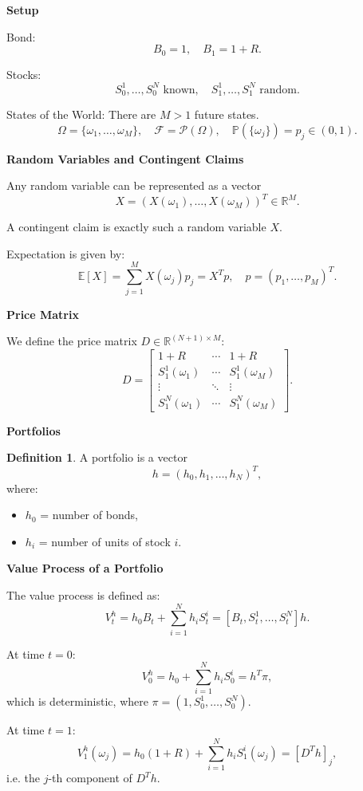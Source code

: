 \documentclass[12pt,a4paper]{article}
\theoremstyle{definition}
\newtheorem{definition}{Definition}[section]
\newcommand{\R}{\mathbb{R}}
\newcommand{\E}{\mathbb{E}}
\newcommand{\Prob}{\mathbb{P}}
\begin{document}
\textbf{Setup}

Bond:
\[
B_0 = 1, \quad B_1 = 1 + R.
\]

Stocks:
\[
S_0^1, \ldots, S_0^N \text{ known}, \quad S_1^1, \ldots, S_1^N \text{ random}.
\]

States of the World:
There are $M > 1$ future states.
\[
\Omega = \{\omega_1, \ldots, \omega_M\}, \quad \mathcal{F} = \mathcal{P}(\Omega), \quad \Prob(\{\omega_j\}) = p_j \in (0,1).
\]

\textbf{Random Variables and Contingent Claims}

Any random variable can be represented as a vector
\[
X = (X(\omega_1), \ldots, X(\omega_M))^T \in \R^M.
\]

A contingent claim is exactly such a random variable $X$.

Expectation is given by:
\[
\E[X] = \sum_{j=1}^M X(\omega_j) p_j = X^T p, \quad p = (p_1, \ldots, p_M)^T.
\]

\textbf{Price Matrix}

We define the price matrix $D \in \R^{(N+1) \times M}$:
\[
D = \begin{bmatrix}
1+R & \cdots & 1+R \\
S_1^1(\omega_1) & \cdots & S_1^1(\omega_M) \\
\vdots & \ddots & \vdots \\
S_1^N(\omega_1) & \cdots & S_1^N(\omega_M)
\end{bmatrix}.
\]

\textbf{Portfolios}

\begin{definition}
A portfolio is a vector
\[
h = (h_0, h_1, \ldots, h_N)^T,
\]
where:
\begin{itemize}
\item $h_0$ = number of bonds,
\item $h_i$ = number of units of stock $i$.
\end{itemize}
\end{definition}

\textbf{Value Process of a Portfolio}

The value process is defined as:
\[
V_t^h = h_0 B_t + \sum_{i=1}^N h_i S_t^i = [B_t, S_t^1, \ldots, S_t^N] h.
\]

At time $t = 0$:
\[
V_0^h = h_0 + \sum_{i=1}^N h_i S_0^i = h^T \pi,
\]
which is deterministic, where $\pi = (1, S_0^1, \ldots, S_0^N)$.

At time $t = 1$:
\[
V_1^h(\omega_j) = h_0(1 + R) + \sum_{i=1}^N h_i S_1^i(\omega_j) = [D^T h]_j,
\]
i.e. the $j$-th component of $D^T h$.
\end{document}
